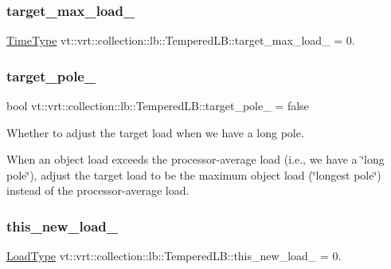 \subsubsection{\texorpdfstring{target\+\_\+max\+\_\+load\+\_\+}{target\_max\_load\_}}
{\footnotesize\ttfamily \hyperlink{namespacevt_a876a9d0cd5a952859c72de8a46881442}{Time\+Type} vt\+::vrt\+::collection\+::lb\+::\+Tempered\+L\+B\+::target\+\_\+max\+\_\+load\+\_\+ = 0.\hspace{0.3cm}{\ttfamily [private]}}

\mbox{\label{structvt_1_1vrt_1_1collection_1_1lb_1_1_tempered_l_b_aa935bb67c93d782cca48524144039deb}} 
\subsubsection{\texorpdfstring{target\+\_\+pole\+\_\+}{target\_pole\_}}
{\footnotesize\ttfamily bool vt\+::vrt\+::collection\+::lb\+::\+Tempered\+L\+B\+::target\+\_\+pole\+\_\+ = false\hspace{0.3cm}{\ttfamily [private]}}



Whether to adjust the target load when we have a long pole. 

When an object load exceeds the processor-\/average load (i.\+e., we have a \char`\"{}long pole\char`\"{}), adjust the target load to be the maximum object load (\char`\"{}longest pole\char`\"{}) instead of the processor-\/average load. \mbox{\label{structvt_1_1vrt_1_1collection_1_1lb_1_1_tempered_l_b_a72ae183e1ee7b56ea2fc151587efc896}} 
\subsubsection{\texorpdfstring{this\+\_\+new\+\_\+load\+\_\+}{this\_new\_load\_}}
{\footnotesize\ttfamily \hyperlink{structvt_1_1vrt_1_1collection_1_1lb_1_1_base_l_b_a215e22b9f12678303f49615ae3be05cc}{Load\+Type} vt\+::vrt\+::collection\+::lb\+::\+Tempered\+L\+B\+::this\+\_\+new\+\_\+load\+\_\+ = 0.\hspace{0.3cm}{\ttfamily [private]}}

